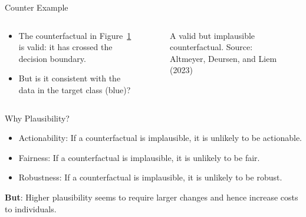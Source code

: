 \documentclass[
  ignorenonframetext,
]{beamer}
\providecommand{\tightlist}{%
  \setlength{\itemsep}{0pt}\setlength{\parskip}{0pt}}\usepackage{longtable,booktabs,array}
\theoremstyle{definition}
\theoremstyle{remark}
\begin{document}
\begin{frame}{Counter Example}
\label{counter-example}
\begin{columns}[T]
\begin{column}{0.5\textwidth}
\begin{itemize}
\tightlist
\item
  The counterfactual in Figure~\ref{fig-implausible} is valid: it has
  crossed the decision boundary.
\item
  But is it consistent with the data in the target class (blue)?
\end{itemize}
\end{column}

\begin{column}{0.5\textwidth}
\begin{figure}


\caption{\label{fig-implausible}A valid but implausible counterfactual.
Source: Altmeyer, Deursen, and Liem (2023)}

\end{figure}%
\end{column}
\end{columns}
\end{frame}

\begin{frame}{Why Plausibility?}
\label{why-plausibility}
\begin{itemize}
\tightlist
\item
  Actionability: If a counterfactual is implausible, it is unlikely to
  be actionable.
\item
  Fairness: If a counterfactual is implausible, it is unlikely to be
  fair.
\item
  Robustness: If a counterfactual is implausible, it is unlikely to be
  robust.
\end{itemize}

\textbf{But}: Higher plausibility seems to require larger changes and
hence increase costs to individuals.
\end{frame}
\end{document}
